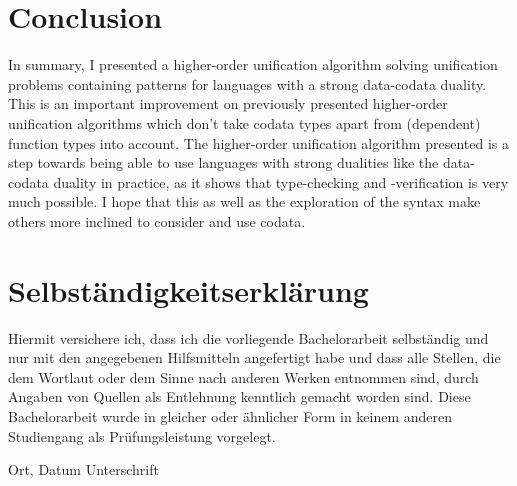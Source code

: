 \documentclass[twoside,12pt,a4paper]{article}
\begin{document}


\section{Conclusion}\label{sec:conclusion}
In summary, I presented a higher-order unification algorithm solving unification problems containing patterns 
for languages with a strong data-codata duality.
This is an important improvement on previously presented higher-order unification algorithms
which don't take codata types apart from (dependent) function types into account. 
The higher-order unification algorithm presented is a step towards 
being able to use languages with strong dualities like the data-codata duality in practice,
as it shows that type-checking and -verification is very much possible.
I hope that this as well as the exploration of the syntax make others more inclined to consider and use codata.






\cleardoublepage

\thispagestyle{empty}
\section*{Selbständigkeitserklärung}

Hiermit versichere ich, dass ich die vorliegende Bachelorarbeit 
selbständig und nur mit den angegebenen Hilfsmitteln angefertigt habe und dass alle Stellen, die dem Wortlaut oder dem 
Sinne nach anderen Werken entnommen sind, durch Angaben von Quellen als 
Entlehnung kenntlich gemacht worden sind. 
Diese Bachelorarbeit wurde in gleicher oder ähnlicher Form in keinem anderen 
Studiengang als Prüfungsleistung vorgelegt. 

\vskip 3cm

Ort, Datum	\hfill Unterschrift \hfill 


\end{document}
